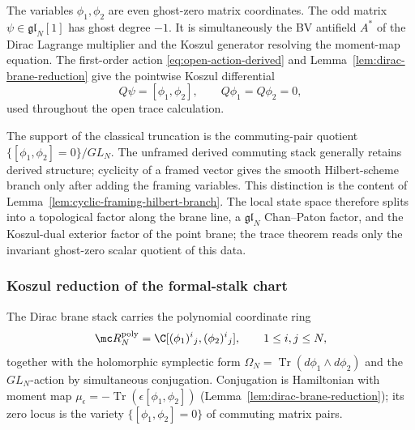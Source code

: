 \documentclass[11pt]{memoir}
\begin{document}
The variables \(\phi_1,\phi_2\) are even ghost-zero matrix
coordinates.  The odd matrix \(\psi\in\mathfrak{gl}_N[1]\) has ghost
degree \(-1\).  It is simultaneously the BV antifield \(A^*\) of the
Dirac Lagrange multiplier and the Koszul generator resolving the
moment-map equation.  The first-order action
\eqref{eq:open-action-derived} and Lemma~\ref{lem:dirac-brane-reduction}
give the pointwise Koszul differential
\[
  Q\psi=[\phi_1,\phi_2],\qquad Q\phi_1=Q\phi_2=0,
\]
used throughout the open trace calculation.

The support of the classical truncation is the commuting-pair quotient
\(\{[\phi_1,\phi_2]=0\}/GL_N\).  The unframed derived commuting stack
generally retains derived structure; cyclicity of a framed vector gives
the smooth Hilbert-scheme branch only after adding the framing variables.
This distinction is the content of
Lemma~\ref{lem:cyclic-framing-hilbert-branch}.  The local state space
therefore splits into a topological factor along the brane line, a
\(\mathfrak{gl}_N\) Chan--Paton factor, and the Koszul-dual exterior
factor of the point brane; the trace theorem reads only the invariant
ghost-zero scalar quotient of this data.

\subsubsection*{Koszul reduction of the formal-stalk chart}

The Dirac brane stack carries the polynomial coordinate ring
\[
  \mc R^{\mathrm{poly}}_N=
    \C[(\phi_1)^i{}_j,(\phi_2)^i{}_j],\qquad 1\le i,j\le N,
\]
together with the holomorphic symplectic form
\(\Omega_N=\operatorname{Tr}(d\phi_1\wedge d\phi_2)\) and the
\(GL_N\)-action by simultaneous conjugation. Conjugation is
Hamiltonian with moment map
\(\mu_\epsilon=-\operatorname{Tr}(\epsilon[\phi_1,\phi_2])\)
(Lemma~\ref{lem:dirac-brane-reduction}); its zero locus is the variety
\(\{[\phi_1,\phi_2]=0\}\) of commuting matrix pairs.
\end{document}
